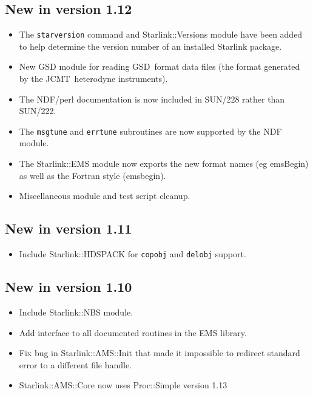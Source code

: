 \documentclass[twoside,11pt]{article}
\newcommand{\gsd}{\xref{{GSD}}{sun229}{}}
\newcommand{\jcmt}{\htmladdnormallink{JCMT}{http://www.jach.hawaii.edu/JACpublic/JCMT}}
\newcommand{\htmladdnormallink}[2]{#1}
\newcommand{\xref}[3]{#1}
\renewcommand{\_}{\texttt{\symbol{95}}}
\begin{document}
\subsection{New in version 1.12}

\begin{itemize}
\item The \texttt{starversion} command and Starlink::Versions module have
been added to help determine the version number of an installed Starlink
package.

\item New GSD module for reading \gsd\ format data files (the format generated
  by the \jcmt\ heterodyne instruments).

\item The NDF/perl documentation is now included in SUN/228 rather than
  SUN/222.

\item The \texttt{msg\_tune} and \texttt{err\_tune} subroutines are now
supported by the NDF module.

\item The Starlink::EMS module now exports the new format names (eg emsBegin)
  as well as the Fortran style (ems\_begin).

\item Miscellaneous module and test script cleanup.

\end{itemize}

\subsection{New in version 1.11}

\begin{itemize}
\item Include Starlink::HDSPACK for \texttt{copobj} and \texttt{delobj}
support.

\end{itemize}

\subsection{New in version 1.10}

\begin{itemize}
\item Include Starlink::NBS module.
\item Add interface to all documented routines in the EMS library.
\item Fix bug in Starlink::AMS::Init that made it impossible to redirect
standard error to a different file handle.
\item Starlink::AMS::Core now uses Proc::Simple version 1.13
\end{itemize}
\end{document}

